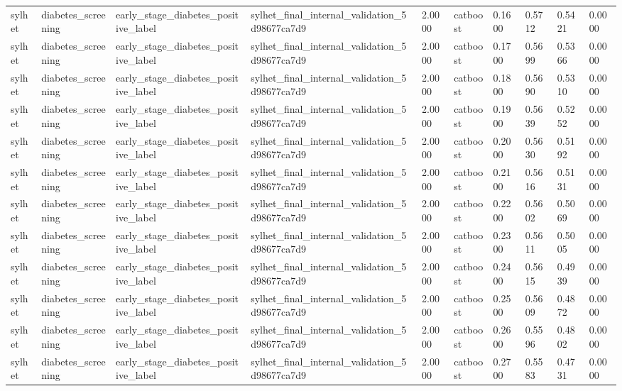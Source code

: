 \begin{tabular}{llllllllll}
sylhet & diabetes\_screening & early\_stage\_diabetes\_positive\_label & sylhet\_final\_internal\_validation\_5d98677ca7d9 & 2.0000 & catboost & 0.1600 & 0.5712 & 0.5421 & 0.0000 \\
sylhet & diabetes\_screening & early\_stage\_diabetes\_positive\_label & sylhet\_final\_internal\_validation\_5d98677ca7d9 & 2.0000 & catboost & 0.1700 & 0.5699 & 0.5366 & 0.0000 \\
sylhet & diabetes\_screening & early\_stage\_diabetes\_positive\_label & sylhet\_final\_internal\_validation\_5d98677ca7d9 & 2.0000 & catboost & 0.1800 & 0.5690 & 0.5310 & 0.0000 \\
sylhet & diabetes\_screening & early\_stage\_diabetes\_positive\_label & sylhet\_final\_internal\_validation\_5d98677ca7d9 & 2.0000 & catboost & 0.1900 & 0.5639 & 0.5252 & 0.0000 \\
sylhet & diabetes\_screening & early\_stage\_diabetes\_positive\_label & sylhet\_final\_internal\_validation\_5d98677ca7d9 & 2.0000 & catboost & 0.2000 & 0.5630 & 0.5192 & 0.0000 \\
sylhet & diabetes\_screening & early\_stage\_diabetes\_positive\_label & sylhet\_final\_internal\_validation\_5d98677ca7d9 & 2.0000 & catboost & 0.2100 & 0.5616 & 0.5131 & 0.0000 \\
sylhet & diabetes\_screening & early\_stage\_diabetes\_positive\_label & sylhet\_final\_internal\_validation\_5d98677ca7d9 & 2.0000 & catboost & 0.2200 & 0.5602 & 0.5069 & 0.0000 \\
sylhet & diabetes\_screening & early\_stage\_diabetes\_positive\_label & sylhet\_final\_internal\_validation\_5d98677ca7d9 & 2.0000 & catboost & 0.2300 & 0.5611 & 0.5005 & 0.0000 \\
sylhet & diabetes\_screening & early\_stage\_diabetes\_positive\_label & sylhet\_final\_internal\_validation\_5d98677ca7d9 & 2.0000 & catboost & 0.2400 & 0.5615 & 0.4939 & 0.0000 \\
sylhet & diabetes\_screening & early\_stage\_diabetes\_positive\_label & sylhet\_final\_internal\_validation\_5d98677ca7d9 & 2.0000 & catboost & 0.2500 & 0.5609 & 0.4872 & 0.0000 \\
sylhet & diabetes\_screening & early\_stage\_diabetes\_positive\_label & sylhet\_final\_internal\_validation\_5d98677ca7d9 & 2.0000 & catboost & 0.2600 & 0.5596 & 0.4802 & 0.0000 \\
sylhet & diabetes\_screening & early\_stage\_diabetes\_positive\_label & sylhet\_final\_internal\_validation\_5d98677ca7d9 & 2.0000 & catboost & 0.2700 & 0.5583 & 0.4731 & 0.0000 \\

\end{tabular}
